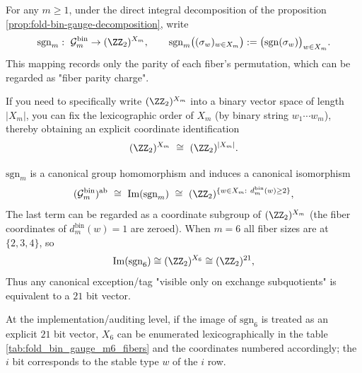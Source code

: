 \begin{definition}\label{def:fold-bin-gauge-sign}
For any \(m\ge 1\), under the direct integral decomposition of the proposition \ref{prop:fold-bin-gauge-decomposition}, write
\[
\mathrm{sgn}_m:\ \mathcal{G}^{\mathrm{bin}}_m\to (\ZZ_2)^{X_m},
\qquad
\mathrm{sgn}_m\bigl((\sigma_w)_{w\in X_m}\bigr):=\bigl(\mathrm{sgn}(\sigma_w)\bigr)_{w\in X_m}.
\]
This mapping records only the parity of each fiber's permutation, which can be regarded as "fiber parity charge".
\par
If you need to specifically write \((\ZZ_2)^{X_m}\) into a binary vector space of length \(|X_m|\), you can fix the lexicographic order of \(X_m\) (by binary string \(w_1\cdots w_m\)), thereby obtaining an explicit coordinate identification
\[
(\ZZ_2)^{X_m}\ \cong\ (\ZZ_2)^{|X_m|}.
\]
\end{definition}

\begin{corollary}[Normativity of fiber odd and even charges and \(21\) bit signature of \texorpdfstring{$m=6$}{m=6}]\label{cor:fold-bin-gauge-sign}
\(\mathrm{sgn}_m\) is a canonical group homomorphism and induces a canonical isomorphism
\[
(\mathcal{G}^{\mathrm{bin}}_m)^{\mathrm{ab}}
\ \cong\
\mathrm{Im}(\mathrm{sgn}_m)
\ \cong\
(\ZZ_2)^{\{w\in X_m:\ d^{\mathrm{bin}}_m(w)\ge 2\}},
\]
The last term can be regarded as a coordinate subgroup of \((\ZZ_2)^{X_m}\) (the fiber coordinates of \(d^{\mathrm{bin}}_m(w)=1\) are zeroed).
When \(m=6\) all fiber sizes are at \(\{2,3,4\}\), so
\[
\mathrm{Im}(\mathrm{sgn}_6)\cong (\ZZ_2)^{X_6}\cong (\ZZ_2)^{21},
\]
Thus any canonical exception/tag "visible only on exchange subquotients" is equivalent to a \(21\) bit vector.
\end{corollary}

\begin{remark}[\texorpdfstring{$m=6$}{m=6} Fiber odd and even charge coordinate sequence (auditable)]\label{rem:fold-bin-gauge-sign-coordinates}
At the implementation/auditing level, if the image of \(\mathrm{sgn}_6\) is treated as an explicit \(21\) bit vector, \(X_6\) can be enumerated lexicographically in the table \ref{tab:fold_bin_gauge_m6_fibers} and the coordinates numbered accordingly; the \(i\) bit corresponds to the stable type \(w\) of the \(i\) row.

\end{remark}

